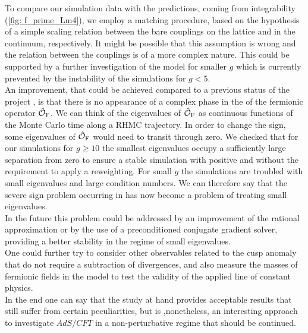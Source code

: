 To compare our simulation data with the predictions, coming from integrability (\autoref{fig: f_prime_Lm4}), we employ a matching procedure, based on the hypothesis of a simple scaling relation between the bare couplings on the lattice and in the continuum, respectively. It might be possible that this assumption is wrong and the relation between the couplings is of a more complex nature. This could be supported by a further investigation of the model for smaller $g$ which is currently prevented by the instability of the simulations for $g <5$.\\
An improvement, that could be achieved compared to a previous status of the project \cite{Bianchi:2016cyv}, is that there is no appearance of a complex phase in the  of the fermionic operator $\hat{\mathcal{O}}_{\rm F}$. We can think of the eigenvalues of $\hat{\mathcal{O}}_{\rm F}$ as continuous functions of the Monte Carlo time along a RHMC trajectory. In order to change the  sign, some eigenvalues of $\hat{\mathcal{O}}_{\rm F}$ would need to transit through zero. We checked that for our simulations for $g \geq 10$ the smallest eigenvalues occupy a sufficiently large separation from zero to ensure  a stable simulation with positive  and without the requirement to apply a reweighting. For small $g$ the simulations are troubled with small eigenvalues and large condition numbers. We can therefore say that the severe sign problem occurring in \cite{Bianchi:2016cyv} has now become a problem of treating small eigenvalues.\\
In the future this problem could be addressed by an improvement of the rational approximation or by the use of a preconditioned conjugate gradient solver, providing a better stability in the regime of small eigenvalues.\\
One could further try to consider other observables related to the cusp anomaly that do not require a subtraction of divergences, and also measure the masses of fermionic fields in the model to test the validity of the applied line of constant physics.\\
In the end one can say that the study at hand provides acceptable results that still suffer from certain peculiarities, but is ,nonetheless, an interesting approach to investigate $AdS/CFT$ in a non-perturbative regime that should be continued.
